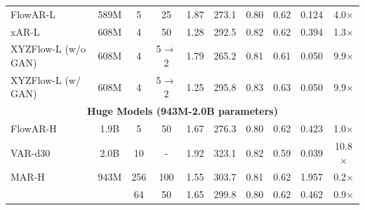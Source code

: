 \documentclass{article}
\theoremstyle{plain}
\theoremstyle{definition}
\theoremstyle{remark}
\begin{document}
\begin{table}[t]
{\begin{tabular}{ l | c | c c | c c | c c | l c}
        FlowAR-L~\cite{ren2024flowar} & 589M & 5 & 25 & 1.87{\color{red}{\tiny$\downarrow$1.02}} & 273.1{\color{red}{\tiny$\uparrow$42.9}} & 0.80 & 0.62{\color{red}{\tiny$\uparrow$0.05}} & 0.124{\color{red}{\tiny$\downarrow$0.370}} & 4.0$\times${\color{red}{\tiny$\uparrow$3.0}} \\
        
        xAR-L~\cite{xar} & 608M & 4 & 50 & 1.28{\color{red}{\tiny$\downarrow$1.61}} & 292.5{\color{red}{\tiny$\uparrow$62.3}} & 0.82{\color{red}{\tiny$\uparrow$0.02}} & 0.62{\color{red}{\tiny$\uparrow$0.05}} & 0.394{\color{blue}{\tiny$\uparrow$0.100}} & 1.3$\times${\color{red}{\tiny$\uparrow$0.3}} \\


        
        \rowcolor{gray!10} XYZFlow-L (w/o GAN) & 608M & 4 & 5$\rightarrow$2 & 1.79{\color{red}{\tiny$\downarrow$1.10}} & 265.2{\color{blue}{\tiny$\downarrow$35.0}} & 0.81{\color{red}{\tiny$\uparrow$0.01}} & 0.61{\color{red}{\tiny$\uparrow$0.04}} & 0.050{\color{red}{\tiny$\downarrow$0.444}} & 9.9$\times${\color{red}{\tiny$\uparrow$8.9}} \\
        \rowcolor{gray!25} XYZFlow-L (w/ GAN) & 608M & 4 & 5$\rightarrow$2 & 1.25{\color{red}{\tiny$\downarrow$1.64}} & 295.8{\color{red}{\tiny$\uparrow$65.6}} & 0.83{\color{red}{\tiny$\uparrow$0.03}} & 0.63{\color{red}{\tiny$\uparrow$0.06}} & 0.050{\color{red}{\tiny$\downarrow$0.444}} & 9.9$\times${\color{red}{\tiny$\uparrow$8.9}} \\


        \midrule
        \multicolumn{10}{c}{\textbf{Huge Models (943M-2.0B parameters)}} \\
        \midrule
        
        FlowAR-H~\cite{ren2024flowar} & 1.9B & 5 & 50 & 1.67 & 276.3 & 0.80 & 0.62 & 0.423 & 1.0$\times$ \\

        VAR-d30~\cite{tian2025var} & 2.0B & 10 & - & 1.92{\color{blue}{\tiny$\uparrow$0.25}} & 323.1{\color{red}{\tiny$\uparrow$46.8}} & 0.82{\color{red}{\tiny$\uparrow$0.02}} & 0.59{\color{blue}{\tiny$\downarrow$0.03}} & 0.039{\color{red}{\tiny$\downarrow$0.384}} & 10.8$\times${\color{red}{\tiny$\uparrow$9.8}} \\

        MAR-H~\cite{mar} & 943M & 256 & 100 & 1.55{\color{red}{\tiny$\downarrow$0.12}} & 303.7{\color{red}{\tiny$\uparrow$27.4}} & 0.81{\color{red}{\tiny$\uparrow$0.01}} & 0.62 & 1.957{\color{blue}{\tiny$\uparrow$1.534}} & 0.2$\times${\color{blue}{\tiny$\downarrow$0.8}} \\
        & & 64 & 50 & 1.65{\color{red}{\tiny$\downarrow$0.02}} & 299.8{\color{red}{\tiny$\uparrow$23.5}} & 0.80 & 0.62 & 0.462{\color{blue}{\tiny$\uparrow$0.039}} & 0.9$\times${\color{blue}{\tiny$\downarrow$0.1}} \\
        

\end{tabular}}
\end{table}
\end{document}
